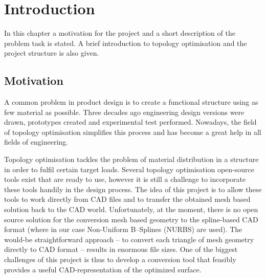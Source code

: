 \chapter{Introduction}
\label{chapter:Introduction}

In this chapter a motivation for the project and a short description of the problem task is stated. A brief introduction to topology optimisation and the project structure is also given.
\section{Motivation}
A common problem in product design is to create a functional structure using as few material as possible. Three decades ago engineering design versions were drawn, prototypes created and experimental test performed. Nowadays, the field of topology optimisation simplifies this process and has become a great help in all fields of engineering. 

Topology optimisation tackles the problem of material distribution in a structure in order to fulfil certain target loads. Several topology optimisation open-source tools exist that are ready to use, however it is still a challenge to incorporate these tools handily in the design process. The idea of this project is to allow these tools to work directly from CAD files and to transfer the obtained mesh based solution back to the CAD world. Unfortunately, at the moment, there is no open source solution for the conversion mesh based geometry to the spline-based CAD format (where in our case Non-Uniform B--Splines (NURBS) are used). The would-be straightforward approach -- to convert each triangle of mesh geometry directly to CAD format -- results in enormous file sizes. One of the biggest challenges of this project is thus to develop a conversion tool that feasibly provides a useful CAD-representation of the optimized surface.


%
%

